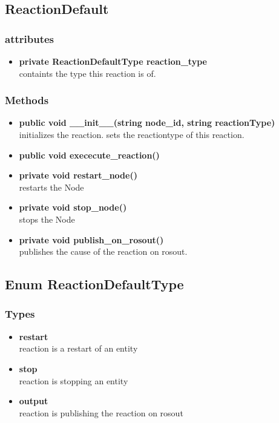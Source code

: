 \subsection{ReactionDefault}
\subsubsection{attributes}
\begin{itemize}
	\item \textbf{ private ReactionDefaultType reaction\_type}\\
		containts the type this reaction is of.
\end{itemize}
\subsubsection{Methods}
\begin{itemize}
	\item \textbf{ public void \_\_init\_\_(string node\_id, string reactionType) }\\
		initializes the reaction. sets the reactiontype of this reaction.
	\item \textbf{ public void exececute\_reaction() }\\
	\item \textbf{ private void restart\_node() }\\
		restarts the Node
	\item \textbf{ private void stop\_node() }\\
		stops the Node
	\item \textbf{ private void publish\_on\_rosout() }\\
		publishes the cause of the reaction on rosout.
\end{itemize}


\subsection{Enum ReactionDefaultType}
\subsubsection{Types}
\begin{itemize}
	\item \textbf{ restart }\\
		reaction is a restart of an entity
	\item \textbf{ stop }\\
		reaction is stopping an entity
	\item \textbf{ output }\\
		reaction is publishing the reaction on rosout
\end{itemize}


